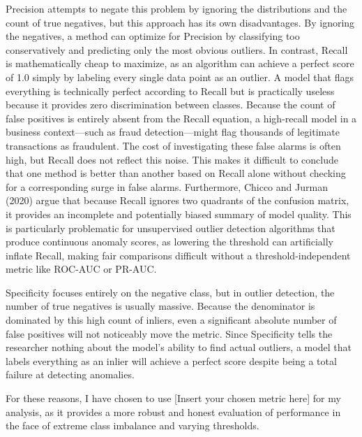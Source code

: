 Precision attempts to negate this problem by ignoring the distributions and the count of true negatives, but this approach has its own disadvantages. 
By ignoring the negatives, a method can optimize for Precision by classifying too conservatively and predicting only the most obvious outliers. 
In contrast, Recall is mathematically cheap to maximize, as an algorithm can achieve a perfect score of 1.0 simply by labeling every single data point as an outlier. 
A model that flags everything is technically perfect according to Recall but is practically useless because it provides zero discrimination between classes. 
Because the count of false positives is entirely absent from the Recall equation, a high-recall model in a business context—such as fraud detection—might flag thousands of legitimate transactions as fraudulent. 
The cost of investigating these false alarms is often high, but Recall does not reflect this noise. 
This makes it difficult to conclude that one method is better than another based on Recall alone without checking for a corresponding surge in false alarms. 
Furthermore, Chicco and Jurman (2020) argue that because Recall ignores two quadrants of the confusion matrix, it provides an incomplete and potentially biased summary of model quality. 
This is particularly problematic for unsupervised outlier detection algorithms that produce continuous anomaly scores, as lowering the threshold can artificially inflate Recall, making fair comparisons difficult without a threshold-independent metric like ROC-AUC or PR-AUC.


Specificity focuses entirely on the negative class, but in outlier detection, the number of true negatives is usually massive. 
Because the denominator is dominated by this high count of inliers, even a significant absolute number of false positives will not noticeably move the metric.  \citep{saito2015precision} 
Since Specificity tells the researcher nothing about the model's ability to find actual outliers, a model that labels everything as an inlier will achieve a perfect score despite being a total failure at detecting anomalies.

For these reasons, I have chosen to use [Insert your chosen metric here] for my analysis, as it provides a more robust and honest evaluation of performance in the face of extreme class imbalance and varying thresholds.